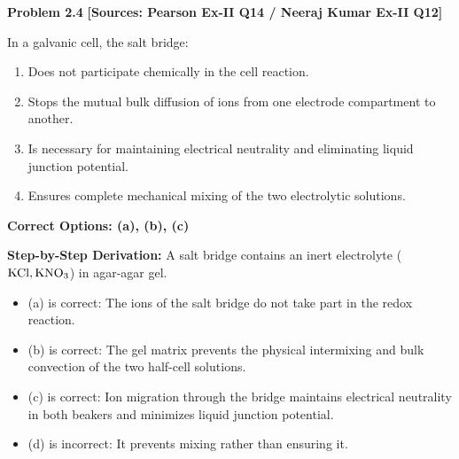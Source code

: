 \begin{problembox}
\textbf{Problem 2.4} \hfill \textbf{[Sources: Pearson Ex-II Q14 / Neeraj Kumar Ex-II Q12]}

In a galvanic cell, the salt bridge:
\begin{enumerate}[label=(\alph*)]
    \item Does not participate chemically in the cell reaction.
    \item Stops the mutual bulk diffusion of ions from one electrode compartment to another.
    \item Is necessary for maintaining electrical neutrality and eliminating liquid junction potential.
    \item Ensures complete mechanical mixing of the two electrolytic solutions.
\end{enumerate}
\end{problembox}
\begin{solution}
\textbf{Correct Options: (a), (b), (c)}

\textbf{Step-by-Step Derivation:}
A salt bridge contains an inert electrolyte ($\ce{KCl}, \ce{KNO3}$) in agar-agar gel.
\begin{itemize}
    \item (a) is correct: The ions of the salt bridge do not take part in the redox reaction.
    \item (b) is correct: The gel matrix prevents the physical intermixing and bulk convection of the two half-cell solutions.
    \item (c) is correct: Ion migration through the bridge maintains electrical neutrality in both beakers and minimizes liquid junction potential.
    \item (d) is incorrect: It prevents mixing rather than ensuring it.
\end{itemize}
\end{solution}

